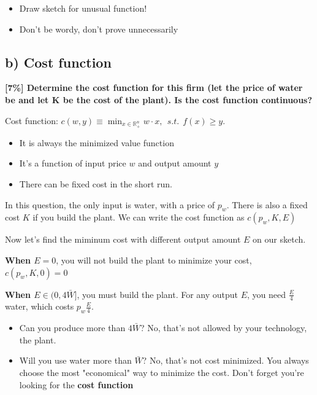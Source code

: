 \documentclass{article}
\newcommand{\R}{\mathbb{R}}
\begin{document}
\begin{mdframed}[backgroundcolor=yellow!20,linecolor=white]
\begin{itemize}
\item Draw sketch for unusual function!
\item Don't be wordy, don't prove unnecessarily 
\end{itemize}
\end{mdframed}

\subsection{b) Cost function}

\textbf{[7\%] Determine the cost function for this firm (let the price of
water be and let K be the cost of the plant). Is the cost function
continuous?}

\begin{mdframed}[backgroundcolor=blue!20,linecolor=white]
Cost function: $c(w,y) \equiv \min_{x \in \R^n_+} w \cdot x , \ \ s.t. \ \ f(x) \ge y.$

\begin{itemize}
\item It is always the minimized value function
\item It's a function of input price $w$ and output amount $y$
\item There can be fixed cost in the short run.
\end{itemize}

In this question, the only input is water, with a price of $p_w$. There is also a fixed cost $K$ if you
build the plant. We can write the cost function as $c(p_w,K,E)$

\vspace{3mm}

Now let's find the miminum cost with different output amount $E$ on our sketch.

\vspace{3mm}

\textbf{When $E=0$}, you will not build the plant to minimize your cost, $c(p_w,K,0) = 0$

\vspace{3mm}

\textbf{When $E \in (0,4\bar{W}]$}, you must build the plant. For any output $E$, you need  $\frac{E}{4}$ water,
which costs $p_w\frac{E}{4}$.

\begin{itemize}
\item Can you produce more than $4\bar{W}$? No, that's not allowed by your technology, the plant.
\item Will you use water more than $\bar{W}$? No, that's not cost minimized. You always choose the most
"economical" way to minimize the cost. Don't forget you're looking for the \textbf{cost function}
\end{itemize}

\end{mdframed}
\end{document}
